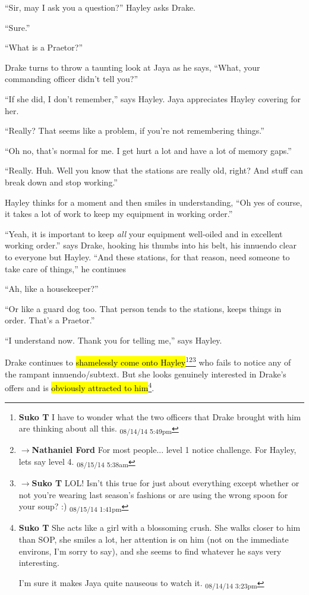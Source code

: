 ``Sir, may I ask you a question?'' Hayley asks Drake.

``Sure.''

``What is a Praetor?''

Drake turns to throw a taunting look at Jaya as he says, ``What, your commanding officer didn't tell you?''

``If she did, I don't remember,'' says Hayley.  Jaya appreciates Hayley covering for her.

``Really?  That seems like a problem, if you're not remembering things.''

``Oh no, that's normal for me.  I get hurt a lot and have a lot of memory gaps.''

``Really.  Huh.  Well you know that the stations are really old, right?  And stuff can break down and stop working.''

Hayley thinks for a moment and then smiles in understanding, ``Oh yes of course, it takes a lot of work to keep my equipment in working order.''

``Yeah, it is important to keep \textit{all} your equipment well-oiled and in excellent working order.'' says Drake, hooking his thumbs into his belt, his innuendo clear to everyone but Hayley.  ``And  these stations, for that reason, need someone to take care of things,'' he continues

``Ah, like a housekeeper?''

``Or like a guard dog too. That person tends to the stations, keeps things in order.  That's a Praetor.''

``I understand now.  Thank you for telling me,'' says Hayley.

Drake continues to \hl{shamelessly come onto Hayley}\footnote{\textbf{Suko T }I have to wonder what the two officers that Drake brought with him are thinking about all this. \textsubscript{08/14/14 5:49pm}}\footnote{$\rightarrow$\textbf{Nathaniel Ford }For most people... level 1 notice challenge. For Hayley, lets say level 4. \textsubscript{08/15/14 5:38am}}\footnote{$\rightarrow$\textbf{Suko T }LOL!  Isn't this true for just about everything except whether or not you're wearing last season's fashions or are using the wrong spoon for your soup? :) \textsubscript{08/15/14 1:41pm}} who fails to notice any of the rampant innuendo/subtext.  But she looks genuinely interested in Drake's offers and is \hl{obviously attracted to him}\footnote{\textbf{Suko T }She acts like a girl with a blossoming crush.  She walks closer to him than SOP, she smiles a lot, her attention is on him (not on the immediate environs, I'm sorry to say), and she seems to find whatever he says very interesting.  

I'm sure it makes Jaya quite nauseous to watch it. \textsubscript{08/14/14 3:23pm}}.

